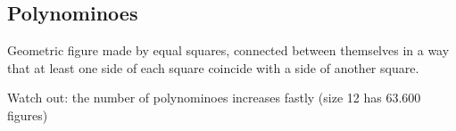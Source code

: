 \subsection{ Polynominoes }

Geometric figure made by equal squares, connected between themselves in a way that at least one side of each square coincide with a side of another square.

Watch out: the number of polynominoes increases fastly (size 12 has 63.600 figures)
